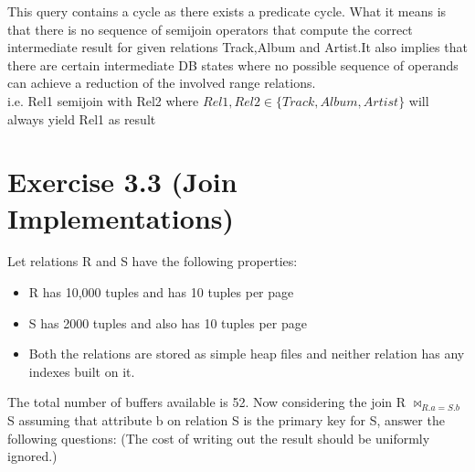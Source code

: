 \documentclass[10pt]{article}
\begin{document}
\begin{enumerate}
\begin{enumerate}[(a)]
					\bigskip
					This query contains a cycle as there exists a predicate cycle. What it means is that there is no 					 sequence of semijoin operators that compute the correct intermediate result for given relations 						Track,Album and Artist.It also implies that there are certain intermediate DB states where no possible sequence of operands can achieve a
                    reduction of the involved range relations.
                    \\i.e. Rel1 semijoin with Rel2 where 
                    $ Rel1,Rel2 \in \{Track,Album,Artist\} $
                    will always yield Rel1 as result
                    
					
				\end{enumerate}
		\end{enumerate}

	\clearpage

	\section*{Exercise 3.3 (Join Implementations)}
		
		Let relations R and S have the following properties:
		\begin{itemize}
			\item R has 10,000 tuples and has 10 tuples per page
			
			\item S has 2000 tuples and also has 10 tuples per page
			
			\item Both the relations are stored as simple heap files and neither relation has any indexes built
			on it.
		\end{itemize}
		
		The total number of buffers available is 52.
		Now considering the join R $\bowtie _{R.a=S.b}$ S assuming that attribute b on relation S is the primary
		key for S, answer the following questions: (The cost of writing out the result should be uniformly
		ignored.)
		
\end{document}
